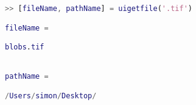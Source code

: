 \begin{lstlisting}[language=matlab]
>> [fileName, pathName] = uigetfile('.tif')

fileName =

blobs.tif


pathName =

/Users/simon/Desktop/

\end{lstlisting}